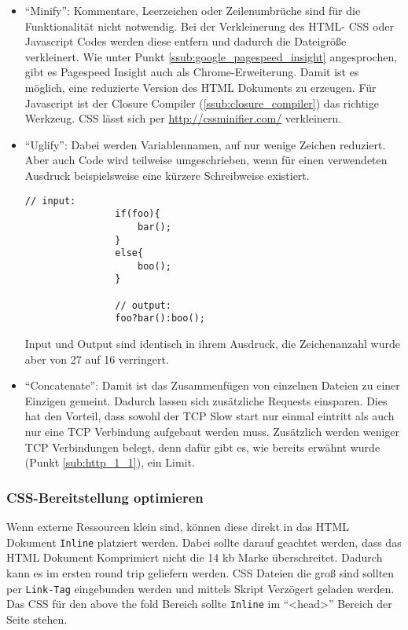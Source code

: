 			\begin{itemize}
				\item "`Minify"': Kommentare, Leerzeichen oder Zeilenumbrüche sind für die Funktionalität nicht notwendig. Bei der Verkleinerung des HTML- CSS oder Javascript Codes werden diese entfern und dadurch die Dateigröße verkleinert. Wie unter Punkt \ref{ssub:google_pagespeed_insight} angesprochen, gibt es Pagespeed Insight auch als Chrome-Erweiterung. Damit ist es möglich, eine reduzierte Version des HTML Dokuments zu erzeugen. Für Javascript ist der Closure Compiler (\ref{ssub:closure_compiler}) das richtige Werkzeug. CSS lässt sich per \url{http://cssminifier.com/} verkleinern.
				\item "`Uglify"': Dabei werden Variablennamen, auf nur wenige Zeichen reduziert. Aber auch Code wird teilweise umgeschrieben, wenn für einen verwendeten Ausdruck beispielsweise eine kürzere Schreibweise existiert.

				\begin{lstlisting}[captionpos=b, caption=Beispiel: Uglify eines Ausdrucks, label=lst:uglify]
				// input:
				if(foo){
					bar();
				}
				else{
					boo();
				}

				// output:
				foo?bar():boo();
				\end{lstlisting}

				Input und Output sind identisch in ihrem Ausdruck, die Zeichenanzahl wurde aber von 27 auf 16 verringert.

				\item "`Concatenate"': Damit ist das Zusammenfügen von einzelnen Dateien zu einer Einzigen gemeint. Dadurch lassen sich zusätzliche Requests einsparen. Dies hat den Vorteil, dass sowohl der TCP Slow start nur einmal eintritt als auch nur eine TCP Verbindung aufgebaut werden muss. Zusätzlich werden weniger TCP Verbindungen belegt, denn dafür gibt es, wie bereits erwähnt wurde (Punkt \ref{sub:http_1_1}), ein Limit.
			\end{itemize}

		\subsubsection{CSS-Bereitstellung optimieren} %
		\label{ssub:css_bereitstellung_optimieren}
			Wenn externe Ressourcen klein sind, können diese direkt in das HTML Dokument \texttt{Inline} platziert werden. Dabei sollte darauf geachtet werden, dass das HTML Dokument Komprimiert nicht die 14 kb Marke überschreitet. Dadurch kann es im ersten round trip geliefern werden. CSS Dateien die groß sind sollten per \texttt{Link-Tag} eingebunden werden und mittels Skript Verzögert geladen werden. Das CSS für den above the fold Bereich sollte \texttt{Inline} im "`<head>"' Bereich der Seite stehen. 

